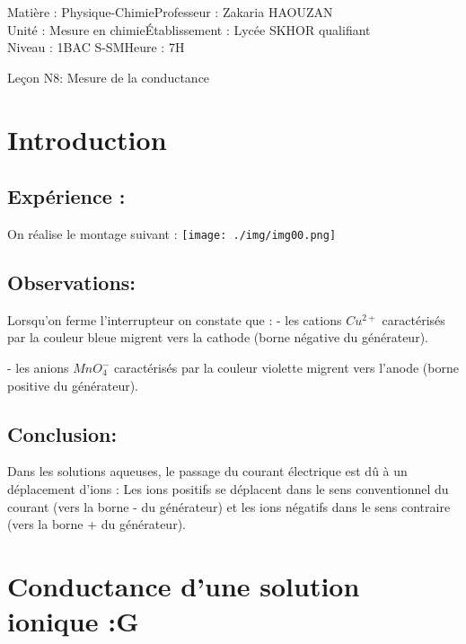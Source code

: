\documentclass[12pt]{article}
\newcommand\headerMe[2]{\noindent{}#1\hfill#2}
\begin{document}
\headerMe{Matière : Physique-Chimie}{Professeur : Zakaria HAOUZAN}\\
\headerMe{Unité : Mesure en chimie}{Établissement : Lycée SKHOR qualifiant}\\
\headerMe{Niveau : 1BAC S-SM}{Heure : 7H}\\

\begin{center}

    \Large{Leçon N8: \color{red} Mesure de la conductance }

\end{center}

\section{Introduction}
    \subsection{Expérience : }
On réalise le montage suivant : 
    \texttt{[image: ./img/img00.png]}

\subsection{Observations: }
Lorsqu’on ferme l’interrupteur on constate que :
- les cations $Cu^{2+}$ caractérisés par la couleur bleue migrent vers la cathode (borne négative du générateur).

- les anions $MnO_4^-$ caractérisés par la couleur violette migrent vers l’anode (borne positive du générateur).

\subsection{Conclusion: }
Dans les solutions aqueuses, le passage du courant électrique est dû à un déplacement d’ions :
Les ions positifs se déplacent dans le sens conventionnel du courant (vers la borne - du générateur) et les ions négatifs dans
le sens contraire (vers la borne + du générateur).

\section{Conductance d’une solution ionique :G }
\end{document}
